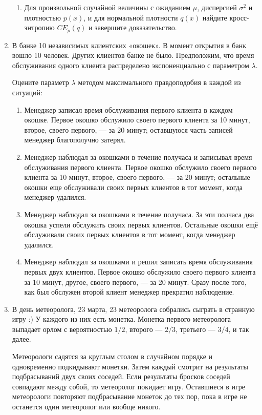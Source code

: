 \begin{enumerate}
\begin{enumerate}
\item Для произвольной случайной величины с ожиданием $\mu$, дисперсией $\sigma^2$ и плотностью $p(x)$, и для нормальной плотности $q(x)$ найдите кросс-энтропию $CE_p(q)$ и завершите доказательство.

\end{enumerate}

\item
В банке 10 независимых клиентских «окошек». В момент открытия в банк вошло 10
человек. Других клиентов банке не было. Предположим, что время обслуживания одного клиента
распределено экспоненциально с параметром $\lambda$.

Оцените параметр $\lambda$ методом максимального правдоподобия в каждой из ситуаций:
\begin{enumerate}
\item Менеджер записал время обслуживания первого клиента в каждом окошке. Первое окошко
  обслужило своего первого клиента за 10 минут, второе, своего первого, — за 20 минут; оставшуюся
  часть записей менеджер благополучно затерял.
\item Менеджер наблюдал за окошками в течение получаса и записывал время обслуживания первого
  клиента. Первое окошко обслужило своего первого клиента за 10 минут, второе, своего первого,
  — за 20 минут; остальные окошки еще обслуживали своих первых клиентов в тот момент, когда
  менеджер удалился.
\item Менеджер наблюдал за окошками в течение получаса.
 За эти полчаса два окошка успели обслужить своих первых клиентов. Остальные окошки
  ещё обслуживали своих первых клиентов в тот момент, когда менеджер удалился.
\item Менеджер наблюдал за окошками и решил записать время обслуживания первых двух клиентов.
  Первое окошко обслужило своего первого клиента за 10 минут, другое, своего первого, — за 20 минут.
  Сразу после того, как был обслужен второй клиент менеджер прекратил наблюдение.
\end{enumerate}

\item В день метеоролога, 23 марта, 23 метеоролога собрались сыграть в странную игру :)
У каждого из них есть монетка.
Монетка первого метеоролога выпадает орлом с вероятностью $1/2$, второго — $2/3$,
третьего — $3/4$, и так далее.

Метеорологи садятся за круглым столом в случайном порядке и одновременно подкидывают монетки.
Затем каждый смотрит на результаты подбрасываний двух своих соседей.
Если результаты бросков соседей совпадают между собой, то метеоролог покидает игру.
Оставшиеся в игре метеорологи повторяют подбрасывание монеток до тех пор,
пока в игре не останется один метеоролог или вообще никого.


\end{enumerate}
